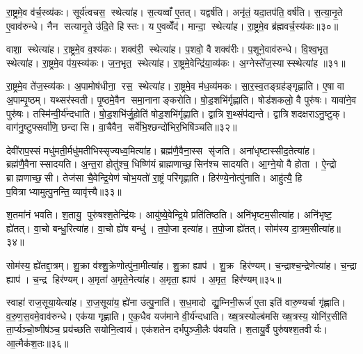 रा॒ष्ट्रमे॒व व॑र्च॒स्व्य॑कः। सूर्य॑त्वचस॒ स्थेत्या॑ह। स॒त्यव्वाँ ए॒तत्। यद्वर्\mbox{}ष॑ति। अनृ॑तं॒ यदा॒तप॑ति॒ वर्\mbox{}ष॑ति। स॒त्या॒नृ॒ते ए॒वाव॑रुन्धे। नैन सत्यानृ॒ते उ॑दि॒ते हिस्तः। य ए॒वव्वेँद॑। मान्दा॒ स्थेत्या॑ह। रा॒ष्ट्रमे॒व ब्र॑ह्मवर्च॒स्य॑कः॥३०॥

वाशा॒ स्थेत्या॑ह। रा॒ष्ट्रमे॒व व॒श्य॑कः। शक्व॑री॒ स्थेत्या॑ह। प॒शवो॒ वै शक्व॑रीः। प॒शूने॒वाव॑रुन्धे। वि॒श्व॒भृत॒ स्थेत्या॑ह। रा॒ष्ट्रमे॒व प॑य॒स्व्य॑कः। ज॒न॒भृत॒ स्थेत्या॑ह। रा॒ष्ट्रमे॒वेन्द्रि॑या॒व्य॑कः। अ॒ग्नेस्ते॑ज॒स्यास्स्थेत्या॑ह ॥३१॥

रा॒ष्ट्रमे॒व ते॑ज॒स्व्य॑कः। अ॒पामोष॑धीना॒ रस॒ स्थेत्या॑ह। रा॒ष्ट्रमे॒व म॑ध॒व्य॑मकः। सा॒र॒स्व॒तङ्ग्रह॑ङ्गृह्णाति। ए॒षा वा अ॒पाम्पृ॒ष्ठम्। यथ्सर॑स्वती। पृ॒ष्ठमे॒वैन समा॒नानाङ्करोति। षो॒ड॒शभि॑र्गृह्णाति। षोड॑शकलो॒ वै पुरु॑षः। यावा॑ने॒व पुरु॑षः। तस्मि॑न्वी॒र्य॑न्दधाति। षो॒ड॒शभि॑र्जु॒होति॑ षोड॒शभि॑र्गृह्णाति। द्वात्रिश॒थ्संप॑द्यन्ते। द्वात्रिशदक्षराऽनु॒ष्टुक्। वाग॑नु॒ष्टुफ्सर्वा॑णि॒ छन्दासि। वा॒चैवैन॒ सर्वे॑भि॒श्छन्दो॑भिर॒भिषि॑ञ्चति॥३२॥\anuvakamend[ऊ॒र्मिरित्या॑ह॒ सूर्य॑वर्चस॒ स्थेत्या॑ह ब्रह्मवर्च॒स्य॑कस्तेज॒स्यास्स्थेत्या॑है॒व पुरु॑ष॒ष्षट् च॑]

देवी॑राप॒स्सं मधु॑मती॒र्मधु॑मतीभिस्सृज्यध्व॒मित्या॑ह। ब्रह्म॑णै॒वैना॒स्स सृ॑जति। अना॑धृष्टास्सीद॒तेत्या॑ह। ब्रह्म॑णै॒वैनास्सादयति। अ॒न्त॒रा होतु॑श्च॒ धिष्णि॑यं ब्राह्मणाच्छ॒सिन॑श्च सादयति। आ॒ग्ने॒यो वै होता। ऐ॒न्द्रो ब्राह्मणाच्छ॒सी। तेज॑सा चै॒वेन्द्रि॒येण॑ चोभ॒यतो॑ रा॒ष्ट्रं परि॑गृह्णाति। हिर॑ण्ये॒नोत्पु॑नाति। आहु॑त्यै॒ हि प॒वित्राभ्यामुत्पु॒नन्ति॒ व्यावृ॑त्त्यै॥३३॥

श॒तमा॑नं भवति। श॒तायु॒ पुरु॑षश्श॒तेन्द्रि॑यः। आयु॑ष्ये॒वेन्द्रि॒ये प्रति॑तिष्ठति। अनि॑भृष्टम॒सीत्या॑ह। अनि॑भृष्ट॒ ह्ये॑तत्। वा॒चो बन्धु॒रित्या॑ह। वा॒चो ह्ये॑ष बन्धु॑। त॒पो॒जा इत्या॑ह। त॒पो॒जा ह्ये॑तत्। सोम॑स्य दा॒त्रम॒सीत्या॑ह॥३४॥

सोम॑स्य॒ ह्ये॑तद्दा॒त्रम्। शु॒क्रा व॑श्शु॒क्रेणोत्पु॑ना॒मीत्या॑ह। शु॒क्रा ह्याप॑। शु॒क्र हिर॑ण्यम्। च॒न्द्राश्च॒न्द्रेणेत्या॑ह। च॒न्द्रा ह्याप॑। च॒न्द्र हिर॑ण्यम्। अ॒मृता॑ अ॒मृते॒नेत्या॑ह। अ॒मृता॒ ह्याप॑। अ॒मृत॒ हिर॑ण्यम्॥३५॥

स्वाहा॑ राज॒सूया॒येत्या॑ह। रा॒ज॒सूया॑य॒ ह्ये॑ना उत्पु॒नाति॑। स॒ध॒मादो द्यु॒म्निनी॒रूर्ज॑ ए॒ता इति॑ वारु॒ण्यर्चा गृ॑ह्णाति। व॒रु॒ण॒स॒वमे॒वाव॑रुन्धे। एक॑या गृह्णाति। ए॒क॒धैव यज॑माने वी॒र्य॑न्दधाति। ख्ष॒त्रस्योल्ब॑मसि ख्ष॒त्रस्य॒ योनि॑र॒सीति॑ ता॒र्प्यञ्चो॒ष्णीष॑ञ्च॒ प्रय॑च्छति सयोनि॒त्वाय॑। एक॑शतेन दर्भपुञ्जी॒लैः प॑वयति। श॒तायु॒र्वै पुरु॑षश्श॒तवीर्यः। आ॒त्मैक॑श॒तः॥३६॥

